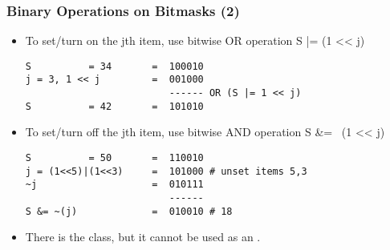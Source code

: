 \begin{frame}[fragile]
  \frametitle{Binary Operations on Bitmasks (2)}
  {\smaller
  \begin{itemize}
  \item To set/turn on the jth item, use bitwise OR operation S |= (1 << j)
\begin{verbatim}
S          = 34       =  100010
j = 3, 1 << j         =  001000
                         ------ OR (S |= 1 << j)
S          = 42       =  101010
\end{verbatim}
\item To set/turn off the jth item, use bitwise AND operation S \&= ~(1 << j)
\begin{verbatim}
S          = 50       =  110010
j = (1<<5)|(1<<3)     =  101000 # unset items 5,3
~j                    =  010111
                         ------
S &= ~(j)             =  010010 # 18
\end{verbatim}
\bigskip

\item There is the  class, but it cannot be used as an
.

  \end{itemize}

  }
\end{frame}
